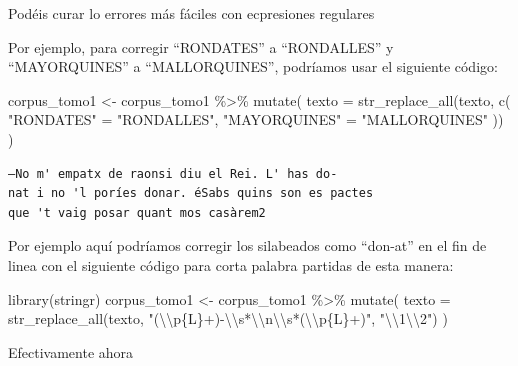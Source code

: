 \documentclass[
  letterpaper,
  DIV=11,
  numbers=noendperiod]{scrreprt}
\newenvironment{Shaded}{\begin{snugshade}}{\end{snugshade}}
\newcommand{\AttributeTok}[1]{\textcolor[rgb]{0.40,0.45,0.13}{#1}}
\newcommand{\FunctionTok}[1]{\textcolor[rgb]{0.28,0.35,0.67}{#1}}
\newcommand{\NormalTok}[1]{\textcolor[rgb]{0.00,0.23,0.31}{#1}}
\newcommand{\OtherTok}[1]{\textcolor[rgb]{0.00,0.23,0.31}{#1}}
\newcommand{\SpecialCharTok}[1]{\textcolor[rgb]{0.37,0.37,0.37}{#1}}
\newcommand{\StringTok}[1]{\textcolor[rgb]{0.13,0.47,0.30}{#1}}
\begin{document}
Podéis curar lo errores más fáciles con ecpresiones regulares

Por ejemplo, para corregir ``RONDATES'' a ``RONDALLES'' y
``MAYORQUINES'' a ``MALLORQUINES'', podríamos usar el siguiente código:

\begin{Shaded}
\begin{Highlighting}[]
\NormalTok{corpus\_tomo1 }\OtherTok{\textless{}{-}}\NormalTok{ corpus\_tomo1 }\SpecialCharTok{\%\textgreater{}\%}
  \FunctionTok{mutate}\NormalTok{(}
    \AttributeTok{texto =} \FunctionTok{str\_replace\_all}\NormalTok{(texto, }\FunctionTok{c}\NormalTok{(}
      \StringTok{"RONDATES"} \OtherTok{=} \StringTok{"RONDALLES"}\NormalTok{,}
      \StringTok{"MAYORQUINES"} \OtherTok{=} \StringTok{"MALLORQUINES"}
\NormalTok{    ))}
\NormalTok{  )}
\end{Highlighting}
\end{Shaded}

\begin{verbatim}
—No m' empatx de raonsi diu el Rei. L' has do-
nat i no 'l poríes donar. éSabs quins son es pactes
que 't vaig posar quant mos casàrem2
\end{verbatim}

Por ejemplo aquí podríamos corregir los silabeados como ``don-at'' en el
fin de linea con el siguiente código para corta palabra partidas de esta
manera:

\begin{Shaded}
\begin{Highlighting}[]
\FunctionTok{library}\NormalTok{(stringr)}
\NormalTok{corpus\_tomo1 }\OtherTok{\textless{}{-}}\NormalTok{ corpus\_tomo1 }\SpecialCharTok{\%\textgreater{}\%}
  \FunctionTok{mutate}\NormalTok{(}
    \AttributeTok{texto =} \FunctionTok{str\_replace\_all}\NormalTok{(texto, }\StringTok{"(}\SpecialCharTok{\textbackslash{}\textbackslash{}}\StringTok{p\{L\}+){-}}\SpecialCharTok{\textbackslash{}\textbackslash{}}\StringTok{s*}\SpecialCharTok{\textbackslash{}\textbackslash{}}\StringTok{n}\SpecialCharTok{\textbackslash{}\textbackslash{}}\StringTok{s*(}\SpecialCharTok{\textbackslash{}\textbackslash{}}\StringTok{p\{L\}+)"}\NormalTok{, }\StringTok{"}\SpecialCharTok{\textbackslash{}\textbackslash{}}\StringTok{1}\SpecialCharTok{\textbackslash{}\textbackslash{}}\StringTok{2"}\NormalTok{)}
\NormalTok{  )}
\end{Highlighting}
\end{Shaded}

Efectivamente ahora
\end{document}
